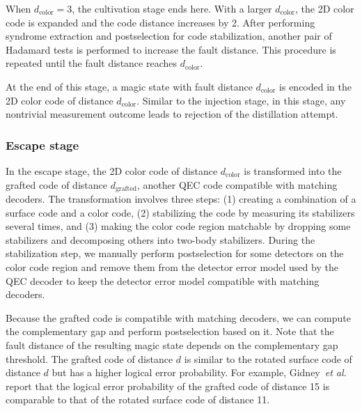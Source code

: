 When $d_\mathrm{color} = 3$, the cultivation stage ends here.
With a larger $d_\mathrm{color}$, the 2D color code is expanded and the code distance increases by 2.
After performing syndrome extraction and postselection for code stabilization, another pair of Hadamard tests is performed to increase the fault distance.
This procedure is repeated until the fault distance reaches $d_\mathrm{color}$.

At the end of this stage, a magic state with fault distance $d_\mathrm{color}$ is encoded in the 2D color code of distance $d_\mathrm{color}$.
Similar to the injection stage, in this stage, any nontrivial measurement outcome leads to rejection of the distillation attempt.

\subsubsection{Escape stage}
\label{subsec:preliminary-magic-state-cultivation-escape}
In the escape stage, the 2D color code of distance $d_\mathrm{color}$ is transformed into the grafted code of distance $d_\mathrm{grafted}$, another QEC code compatible with matching decoders.
The transformation involves three steps:
(1) creating a combination of a surface code and a color code,
(2) stabilizing the code by measuring its stabilizers several times, and
(3) making the color code region matchable by dropping some stabilizers and decomposing others into two-body stabilizers.
During the stabilization step, we manually perform postselection for some detectors on the color code region and remove them from the detector error model used by the QEC decoder to keep the detector error model compatible with matching decoders.

Because the grafted code is compatible with matching decoders, we can compute the complementary gap and perform postselection based on it.
Note that the fault distance of the resulting magic state depends on the complementary gap threshold.
The grafted code of distance $d$ is similar to the rotated surface code of distance $d$ but has a higher logical error probability.
For example, Gidney~\textit{et al.}~\cite{Gidney2024MagicStateCultivation} report that the logical error probability of the grafted code of distance 15 is comparable to that of the rotated surface code of distance 11.